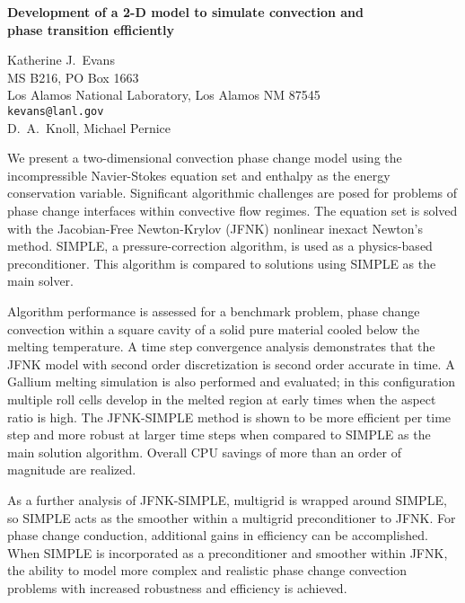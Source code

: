 \documentclass{report}
\begin{document}

\begin{center}
{\large
{\bf Development of a 2-D model to simulate convection and \\
	phase transition efficiently}}

	Katherine J.~Evans \\
	MS B216, PO Box 1663 \\
	Los Alamos National Laboratory, Los Alamos NM 87545 \\
	{\tt kevans@lanl.gov} \\
	D.~A.~Knoll, Michael Pernice
\end{center}
We present a two-dimensional convection phase change model
using the incompressible Navier-Stokes equation set and
enthalpy as the energy conservation variable. Significant
algorithmic challenges are posed for problems of phase
change interfaces within convective flow regimes. The
equation set is solved with the Jacobian-Free Newton-Krylov
(JFNK) nonlinear inexact Newton's method. SIMPLE, a
pressure-correction algorithm, is used as a physics-based
preconditioner. This algorithm is compared to solutions
using SIMPLE as the main solver.

Algorithm performance is
assessed for a benchmark problem, phase change convection
within a square cavity of a solid pure material cooled below
the melting temperature. A time step convergence analysis
demonstrates that the JFNK model with second order
discretization is second order accurate in time. A Gallium
melting simulation is also performed and evaluated; in this
configuration multiple roll cells develop in the melted
region at early times when the aspect ratio is high. The
JFNK-SIMPLE method is shown to be more efficient per time
step and more robust at larger time steps when compared to
SIMPLE as the main solution algorithm. Overall CPU savings
of more than an order of magnitude are realized.

As a
further analysis of JFNK-SIMPLE, multigrid is wrapped around
SIMPLE, so SIMPLE acts as the smoother within a multigrid
preconditioner to JFNK. For phase change conduction,
additional gains in efficiency can be accomplished. When
SIMPLE is incorporated as a preconditioner and smoother
within JFNK, the ability to model more complex and realistic
phase change convection problems with increased robustness
and efficiency is achieved.



\end{document}
